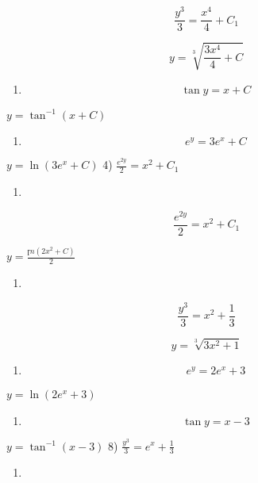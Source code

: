 \documentclass[
]{article}
\providecommand{\tightlist}{%
  \setlength{\itemsep}{0pt}\setlength{\parskip}{0pt}}
\begin{document}
\[\frac{y^3}{3} = \frac{x^4}{4} + C_1\]

\[y = \sqrt[3]{\frac{3x^4}{4} + C}\]

\begin{enumerate}
\def\labelenumi{\arabic{enumi})}
\setcounter{enumi}{1}
\tightlist
\item
  \[\tan y = x + C\]
\end{enumerate}

\(y = \tan^{-1} (x + C)\)

\begin{enumerate}
\def\labelenumi{\arabic{enumi})}
\setcounter{enumi}{2}
\tightlist
\item
  \[e^y = 3e^x + C\]
\end{enumerate}

\(y = \ln (3e^x + C)\) 4) \(\frac{e^{2y}}{2} = x^2 + C_1\)

\begin{enumerate}
\def\labelenumi{\arabic{enumi})}
\setcounter{enumi}{3}
\tightlist
\item
\end{enumerate}

\[\frac{e^{2y}}{2} = x^2 + C_1\]

\(y = \frac{ɼn(2x^2 + C)}{2}\)

\begin{enumerate}
\def\labelenumi{\arabic{enumi})}
\setcounter{enumi}{4}
\tightlist
\item
\end{enumerate}

\[\frac{y^3}{3} = x^2 + \frac{1}{3}\]

\[y = \sqrt[3]{3x^2 + 1}\]

\begin{enumerate}
\def\labelenumi{\arabic{enumi})}
\setcounter{enumi}{5}
\tightlist
\item
  \[e^y = 2e^x + 3\]
\end{enumerate}

\(y = \ln (2e^x + 3)\)

\begin{enumerate}
\def\labelenumi{\arabic{enumi})}
\setcounter{enumi}{6}
\tightlist
\item
  \[\tan y = x - 3\]
\end{enumerate}

\(y = \tan^{-1}(x - 3)\) 8) \(\frac{y^3}{3} = e^x + \frac{1}{3}\)

\begin{enumerate}
\def\labelenumi{\arabic{enumi})}
\setcounter{enumi}{7}
\tightlist
\item
\end{enumerate}
\end{document}
